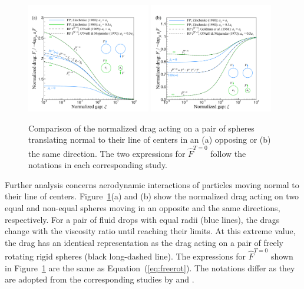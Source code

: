 \documentclass[../thesis.tex]{subfiles}
\begin{document}
\begin{figure}%
\center
{\includegraphics[trim=05mm 00mm 20mm 15mm, clip, width=0.48\textwidth]{../figs/PRF/fig6a.pdf}
 \includegraphics[trim=05mm 00mm 20mm 15mm, clip, width=0.48\textwidth]{../figs/PRF/fig6b.pdf}}
\caption{Comparison of the normalized drag acting on a pair of spheres translating normal to their line of centers in an (a) opposing or (b) the same direction. The two expressions for $\hat{F}^{T=0}$ follow the notations in each corresponding study.}
\label{fig:fluidy}
\end{figure}%

Further analysis concerns aerodynamic interactions of particles moving normal to their line of centers. Figure~\ref{fig:fluidy}(a) and (b) show the normalized drag acting on two equal and non-equal spheres moving in an opposite and the same directions, respectively. For a pair of fluid drops with equal radii (blue lines), the drags change with the viscosity ratio until reaching their limits. At this extreme value, the drag has an identical representation as the drag acting on a pair of freely rotating rigid spheres (black long-dashed line). The expressions for $\hat{F}^{T=0}$ shown in Figure~\ref{fig:fluidy} are the same as Equation~(\ref{eq:freerot}). The notations differ as they are adopted from the corresponding studies by \cite{GCB66} and \cite{ON69}.
\end{document}

